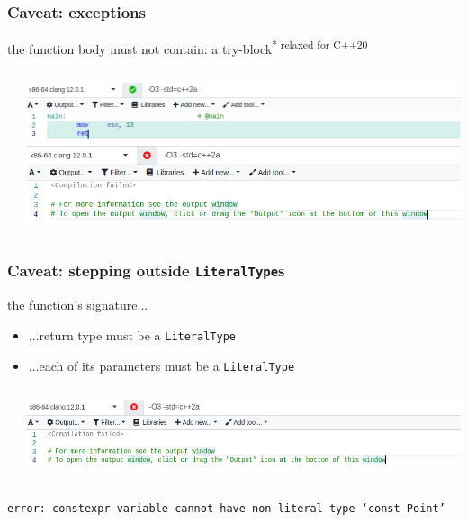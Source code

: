 \documentclass[aspectratio=169]{beamer}
\begin{document}
\begin{frame}
\frametitle{Caveat: exceptions}
the function body must not contain: a try-block\textsuperscript{\textcolor{clGreen}{* relaxed for C++20}} \\
\begin{columns}
  \begin{column}{0.45\textwidth}
    {\fontsize{8}{8} }
  \end{column}
  \begin{column}{0.5\textwidth}
    \includegraphics[width=\textwidth]{pics/04_success_when_not_thrown.png}\\
    \vspace{36pt}
    \includegraphics[width=\textwidth]{pics/04_failed_when_thrown.png}\\
  \end{column}
\end{columns}
\end{frame}

\begin{frame}
\frametitle{Caveat: stepping outside \texttt{LiteralType}s}
the function's signature...
\begin{itemize}
  \item{...return type must be a \texttt{LiteralType}}
  \item{...each of its parameters must be a \texttt{LiteralType}}
\end{itemize}
\vspace{12pt}
\begin{columns}
  \begin{column}{0.45\textwidth}
    {\fontsize{7}{7} }
  \end{column}
  \begin{column}{0.5\textwidth}
    \includegraphics[width=\textwidth]{pics/05_not_a_LiteralType.png}\\
  \end{column}
\end{columns}
\texttt{error: constexpr variable cannot have non-literal type `const Point'}
\end{frame}
\end{document}
